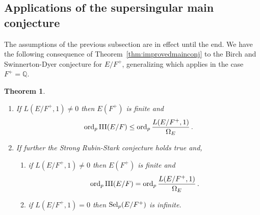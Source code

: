 \documentclass[12pt]{amsart}
\numberwithin{equation}{section}
\newtheorem{thm}{Theorem}[section]
\begin{document}
\subsection{Applications of the supersingular main conjecture}
The assumptions of the previous subsection are in effect until the end. We have the following consequence of Theorem~\ref{thm:improvedmainconj} to the Birch and Swinnerton-Dyer conjecture for $E/F^+$, generalizing \cite[Theorem 11.4]{rubinmainconj} which applies in the case $F^+={\mathbb{Q}}$.
\begin{thm}
\label{thm:bsd}
\begin{enumerate} 
\item If $L(E/F^+,1)\neq 0$ then $E(F^+)$ is finite and 
$$\displaystyle{\textup{ord}_p\,\textup{III}(E/F)\leq \textup{ord}_p\, \frac{L(E/F^+,1)}{\Omega_E}}\,.$$ 
\item If further the Strong Rubin-Stark conjecture holds true and,
\begin{enumerate}
\item if $L(E/F^+,1)\neq 0$ then $E(F^+)$ is finite and 
$$\displaystyle{\textup{ord}_p\,\textup{III}(E/F)= \textup{ord}_p\, \frac{L(E/F^+,1)}{\Omega_E}}\,.$$ 
\item  if $L(E/F^+,1)=0$ then $\textup{Sel}_p(E/F^+)$ is infinite.
\end{enumerate}
\end{enumerate}
\end{thm}
\end{document}
